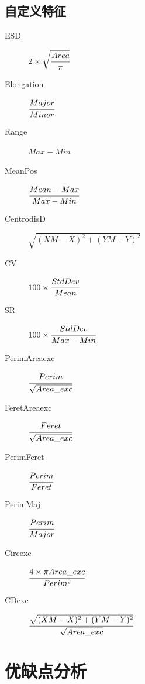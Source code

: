 \documentclass[12pt]{article}
\begin{document}
\subsection{自定义特征}
\begin{description}
    \item[ESD] $2 \times \sqrt{\cfrac{Area}{\pi}}$
    \item[Elongation] $\cfrac{Major}{Minor}$
    \item[Range] $Max-Min$
    \item[MeanPos] $\cfrac{Mean-Max}{Max-Min}$
    \item[CentrodisD] $\sqrt{(XM-X)^{2}+(YM-Y)^{2}}$
    \item[CV] $100 \times \cfrac{StdDev}{Mean}$
    \item[SR] $100 \times \cfrac{StdDev}{Max-Min}$
    \item[PerimAreaexc] $\cfrac{Perim}{\sqrt{Area\_exc}}$
    \item[FeretAreaexc] $\cfrac{Feret}{\sqrt{Area\_exc}}$
    \item[PerimFeret] $\cfrac{Perim}{Feret}$
    \item[PerimMaj] $\cfrac{Perim}{Major}$
    \item[Circexc] $\cfrac{4 \times \pi Area\_exc}{Perim^{2}}$
    \item[CDexc] $\cfrac{\sqrt{(XM-X)^{2}+(YM-Y)^{2}}}{{\sqrt{Area\_exc}}}$
\end{description}

\section{优缺点分析}














%


\end{document}
